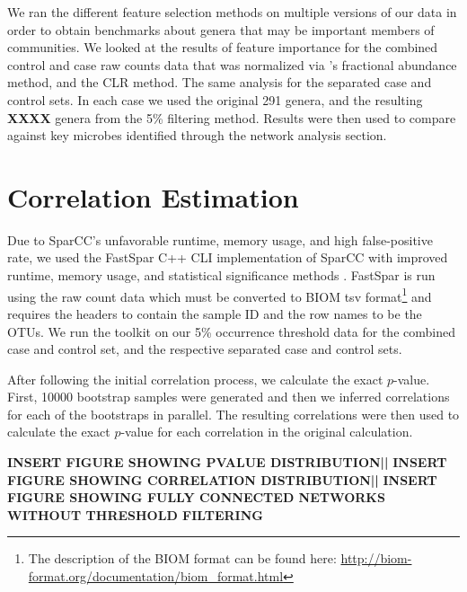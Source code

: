 We ran the different feature selection methods on multiple versions of our data in order to obtain benchmarks about genera that may be important members of communities. We looked at the results of feature importance for the combined control and case raw counts data that was normalized via \citeauthor{Duvallet2017}'s fractional abundance method, and the \acrshort{CLR} method. The same analysis for the separated case and control sets. In each case we used the original 291 genera, and the resulting \textbf{XXXX} genera from the 5\% filtering method. Results were then used to compare against key microbes identified through the network analysis section.

\section{Correlation Estimation}\label{meth:spar}
Due to SparCC's unfavorable runtime, memory usage, and high false-positive rate, we used the FastSpar C++ \acrfull{CLI} implementation of SparCC with improved runtime, memory usage, and statistical significance methods \citep{Friedman2012,Watts2018}. FastSpar is run using the raw count data which must be converted to BIOM tsv format\footnote{The description of the BIOM format can be found here: \url{http://biom-format.org/documentation/biom_format.html}} and requires the headers to contain the sample ID and the row names to be the \acrshort{OTU}s. We run the toolkit on our 5\% occurrence threshold data for the combined case and control set, and the respective separated case and control sets. 

After following the initial correlation process, we calculate the exact $p$-value. First, 10000 bootstrap samples were generated and then we inferred correlations for each of the bootstraps in parallel. The resulting correlations were then used to calculate the exact $p$-value for each correlation in the original calculation. 

\textbf{INSERT FIGURE SHOWING PVALUE DISTRIBUTION||}
\textbf{INSERT FIGURE SHOWING CORRELATION DISTRIBUTION||}
\textbf{INSERT FIGURE SHOWING FULLY CONNECTED NETWORKS WITHOUT THRESHOLD FILTERING}

